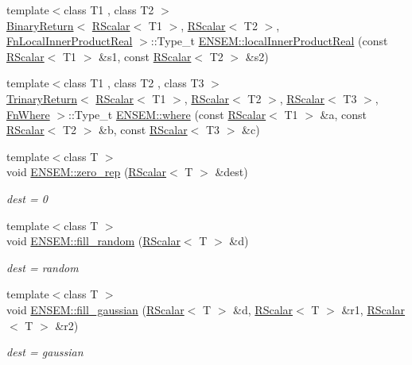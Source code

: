 \begin{DoxyCompactItemize}
\item 
{\footnotesize template$<$class T1 , class T2 $>$ }\\\mbox{\hyperlink{structENSEM_1_1BinaryReturn}{Binary\+Return}}$<$ \mbox{\hyperlink{classENSEM_1_1RScalar}{R\+Scalar}}$<$ T1 $>$, \mbox{\hyperlink{classENSEM_1_1RScalar}{R\+Scalar}}$<$ T2 $>$, \mbox{\hyperlink{structENSEM_1_1FnLocalInnerProductReal}{Fn\+Local\+Inner\+Product\+Real}} $>$\+::Type\+\_\+t \mbox{\hyperlink{group__rscalar_gafd6d5a4377919b182f234ffe0eea09b4}{E\+N\+S\+E\+M\+::local\+Inner\+Product\+Real}} (const \mbox{\hyperlink{classENSEM_1_1RScalar}{R\+Scalar}}$<$ T1 $>$ \&s1, const \mbox{\hyperlink{classENSEM_1_1RScalar}{R\+Scalar}}$<$ T2 $>$ \&s2)
\item 
{\footnotesize template$<$class T1 , class T2 , class T3 $>$ }\\\mbox{\hyperlink{structENSEM_1_1TrinaryReturn}{Trinary\+Return}}$<$ \mbox{\hyperlink{classENSEM_1_1RScalar}{R\+Scalar}}$<$ T1 $>$, \mbox{\hyperlink{classENSEM_1_1RScalar}{R\+Scalar}}$<$ T2 $>$, \mbox{\hyperlink{classENSEM_1_1RScalar}{R\+Scalar}}$<$ T3 $>$, \mbox{\hyperlink{structENSEM_1_1FnWhere}{Fn\+Where}} $>$\+::Type\+\_\+t \mbox{\hyperlink{group__rscalar_gab32228a08de8d1e17ba1f7829c1aff56}{E\+N\+S\+E\+M\+::where}} (const \mbox{\hyperlink{classENSEM_1_1RScalar}{R\+Scalar}}$<$ T1 $>$ \&a, const \mbox{\hyperlink{classENSEM_1_1RScalar}{R\+Scalar}}$<$ T2 $>$ \&b, const \mbox{\hyperlink{classENSEM_1_1RScalar}{R\+Scalar}}$<$ T3 $>$ \&c)
\item 
{\footnotesize template$<$class T $>$ }\\void \mbox{\hyperlink{group__rscalar_ga2d621f22841a02293225a92dcfcb4642}{E\+N\+S\+E\+M\+::zero\+\_\+rep}} (\mbox{\hyperlink{classENSEM_1_1RScalar}{R\+Scalar}}$<$ T $>$ \&dest)
\begin{DoxyCompactList}\small\item\em dest = 0 \end{DoxyCompactList}\item 
{\footnotesize template$<$class T $>$ }\\void \mbox{\hyperlink{group__rscalar_ga02bacd2a18d81f6f0e7d137a7d21ee23}{E\+N\+S\+E\+M\+::fill\+\_\+random}} (\mbox{\hyperlink{classENSEM_1_1RScalar}{R\+Scalar}}$<$ T $>$ \&d)
\begin{DoxyCompactList}\small\item\em dest = random \end{DoxyCompactList}\item 
{\footnotesize template$<$class T $>$ }\\void \mbox{\hyperlink{group__rscalar_gaaefd5c2ab83b53fd225f3198277789f3}{E\+N\+S\+E\+M\+::fill\+\_\+gaussian}} (\mbox{\hyperlink{classENSEM_1_1RScalar}{R\+Scalar}}$<$ T $>$ \&d, \mbox{\hyperlink{classENSEM_1_1RScalar}{R\+Scalar}}$<$ T $>$ \&r1, \mbox{\hyperlink{classENSEM_1_1RScalar}{R\+Scalar}}$<$ T $>$ \&r2)
\begin{DoxyCompactList}\small\item\em dest = gaussian \end{DoxyCompactList}\end{DoxyCompactItemize}


